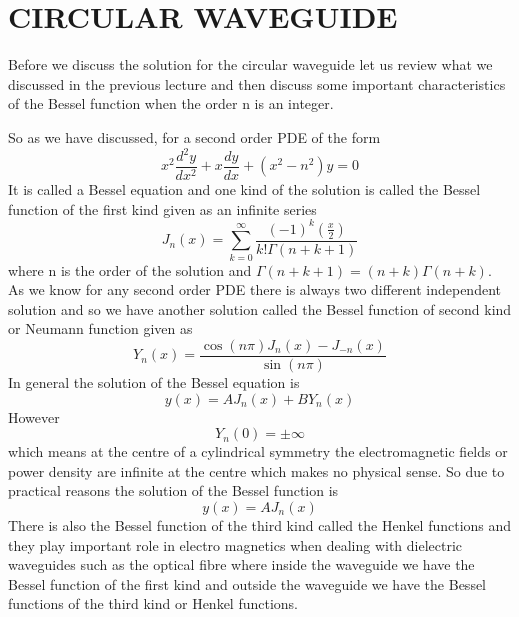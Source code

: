 \chapter[Circular Waveguide]{CIRCULAR WAVEGUIDE}
Before we discuss the solution for the circular waveguide let us review what we discussed in the previous lecture and then discuss some important characteristics of the Bessel function when the order n is an integer.

So as we have discussed, for a second order PDE of the form 
\begin{displaymath}
x^2\frac{d^2y}{dx^2} + x\frac{dy}{dx} + (x^2-n^2)y {=} 0
\end{displaymath}
It is called a Bessel equation and one kind of the solution is called the Bessel function of the first kind given as an infinite series
\begin{displaymath}
J_n(x) {=} \sum^\infty_{k=0} \frac{(-1)^k (\frac{x}{2})}{k!\Gamma(n+k+1)}
\end{displaymath}
where n is the order of the solution and $\Gamma(n+k+1){=}(n+k)\Gamma(n+k)$. As we know for any second order PDE there is always two different independent solution and so we have another solution called the Bessel function of second kind or Neumann function given as 
\[Y_n(x) = \frac{\cos(n\pi)J_n(x)-J_{-n}(x)}{\sin(n\pi)} \]
In general the solution of the Bessel equation is \[y(x) = A J_n(x) + B Y_n(x)\]
However \[Y_n(0)=\pm\infty\] which means at the centre of a cylindrical symmetry the electromagnetic fields or power density are infinite at the centre which makes no physical sense. So due to practical reasons the solution of the Bessel function is 
\[y(x) = A J_n(x) \]
There is also the Bessel function of the third kind called the Henkel functions and they play important role in electro magnetics when dealing with dielectric waveguides such as the optical fibre where inside the waveguide we have the Bessel function of the first kind and outside the waveguide we have the Bessel functions of the third kind or Henkel functions.
 
